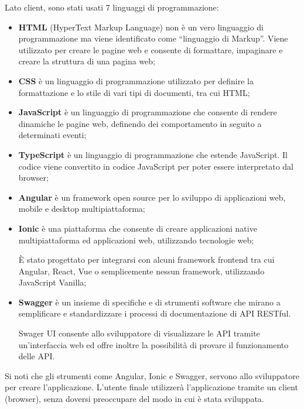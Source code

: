 \documentclass[a4paper]{article}
\newcommand{\dquotes}[1]{``#1''}
\begin{document}
	Lato client, sono stati usati 7 linguaggi di programmazione:
	\begin{itemize}
		\item \textbf{HTML} (HyperText Markup Language) non è un vero linguaggio di programmazione ma viene identificato come \dquotes{linguaggio di Markup}. Viene utilizzato per creare le pagine web e consente di formattare, impaginare e creare la struttura di una pagina web;
		
		\item \textbf{CSS} è un linguaggio di programmazione utilizzato per definire la formattazione e lo stile di vari tipi di documenti, tra cui HTML;
		
		\item \textbf{JavaScript} è un linguaggio di programmazione che consente di rendere dinamiche le pagine web, definendo dei comportamento in seguito a determinati eventi;
		
		\item \textbf{TypeScript} è un linguaggio di programmazione che estende JavaScript. Il codice viene convertito in codice JavaScript per poter essere interpretato dal browser;
		
		\item \textbf{Angular} è un framework open source per lo sviluppo di applicazioni web, mobile e desktop multipiattaforma;
		
		\item \textbf{Ionic} è una piattaforma che consente di creare applicazioni native multipiattaforma ed applicazioni web, utilizzando tecnologie web;
		
		È stato progettato per integrarsi con alcuni framework frontend tra cui Angular, React, Vue o semplicemente nessun framework, utilizzando JavaScript Vanilla;
		
		\item \textbf{Swagger} è un insieme di specifiche e di strumenti software che mirano a semplificare e standardizzare i processi di documentazione di API RESTful.
		
		Swager UI consente allo sviluppatore di visualizzare le API tramite un'interfaccia web ed offre inoltre la possibilità di provare il funzionamento delle API.
	\end{itemize}
	Si noti che gli strumenti come Angular, Ionic e Swagger, servono allo sviluppatore per creare l'applicazione. L'utente finale utilizzerà l'applicazione tramite un client (browser), senza doversi preoccupare del modo in cui è stata sviluppata.\newpage
	
\end{document}
